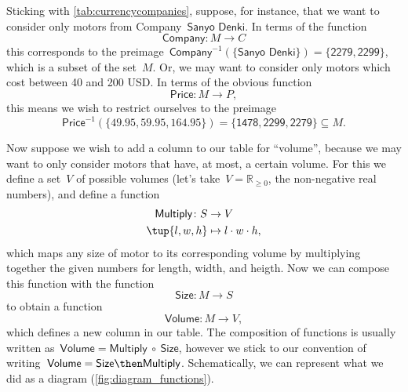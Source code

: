 Sticking with \cref{tab:currencycompanies}, suppose, for instance, that we want to consider only motors from Company~$\textsf{Sanyo Denki}$. In terms of the function
\begin{equation*}
\textsf{Company}\colon M \to C
\end{equation*}
this corresponds to the preimage~$\textsf{Company}^{-1}(\{ \textsf{Sanyo Denki} \}) = \{ \textsf{2279}, \textsf{2299}\}$, which is a subset of the set~$M$. Or, we may want to consider only motors which cost between 40 and 200 USD. In terms of the obvious function
\begin{equation*}
\textsf{Price}\colon M \to P,
\end{equation*}
this means we wish to restrict ourselves to the preimage
\begin{equation*}
\textsf{Price}^{-1}(\{ 49.95, 59.95, 164.95\}) = \{ \textsf{1478}, \textsf{2299}, \textsf{2279} \} \subseteq M.
\end{equation*}

Now suppose we wish to add a column to our table for ``volume'', because we may want to only consider motors that have, at most, a certain volume. For this we define a set~$V$ of possible volumes (let's take~$V = \mathbb{R}_{\geq 0}$, the non-negative real numbers), and define a function
\begin{equation*}
\begin{aligned}
\textsf{Multiply}\colon S &\to V\\
\tup{l, w, h} &\mapsto l \cdot w \cdot h,
\end{aligned}
\end{equation*}
which maps any size of motor to its corresponding volume by multiplying together the given numbers for length, width, and heigth.  Now we can compose this function with the function
\begin{equation*}
\textsf{Size}\colon M \to S
\end{equation*}
to obtain a function
\begin{equation*}
\textsf{Volume}\colon M \to V,
\end{equation*}
which defines a new column in our table. The composition of functions is usually written as~$\textsf{Volume} = \textsf{Multiply} \ \circ \ \textsf{Size}$, however we stick to our convention of writing~$\textsf{Volume} = \textsf{Size} \then \textsf{Multiply}$. Schematically, we can represent what we did as a diagram (\cref{fig:diagram_functions}).



